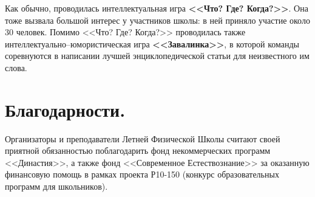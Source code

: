 \documentclass[12pt,a4paper,oneside]{scrartcl}
\newlength{\h}
\newlength{\x}
\begin{document}
Как обычно, проводилась интеллектуальная игра \textbf{<<Что? Где?
  Когда?>>}. Она тоже вызвала большой интерес у участников школы: в
ней приняло участие около 30 человек. Помимо <<Что? Где?  Когда?>>
проводилась также интеллектуально--юмористическая игра
\textbf{<<Завалинка>>}, в которой команды соревнуются в написании
лучшей энциклопедической статьи для неизвестного им слова. 

\begin{figure}[h]
  \centering
  \hspace{0.05\textwidth}
\end{figure}

\clearpage
\section{Благодарности.}
\label{sec:acknowledgments}

Организаторы и преподаватели Летней Физической Школы считают своей
приятной обязанностью поблагодарить фонд некоммерческих программ
<<Династия>>, а также фонд <<Современное Естествознание>> за
оказанную финансовую помощь в рамках проекта Р10-150 (конкурс образовательных
программ для школьников). 
\end{document}
